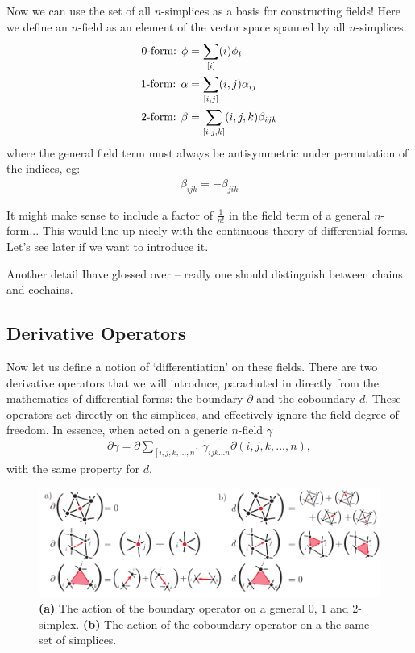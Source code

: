 \documentclass[11pt, oneside]{article} %
\numberwithin{equation}{section}
\begin{document}
Now we can use the set of all $n$-simplices as a basis for constructing fields! Here we define an $n$-field as an element of the vector space spanned by all $n$-simplices:
\begin{align}
    \textup{0-form: } \phi &= \sum_{[i]} (i) \phi_{i}  \\ 
    \textup{1-form: } \alpha &= \sum_{[i,j]} (i,j) \alpha_{ij} \\ 
    \textup{2-form: } \beta &= \sum_{[i,j,k]}(i,j,k) \beta_{ijk} 
\end{align}
where the general field term must always be antisymmetric under permutation of the indices, eg:
\begin{align}
    \beta_{ijk} = - \beta_{jik}
\end{align}

\begin{shaded}
    It might make sense to include a factor of $\frac 1{n!}$ in the field term of a general $n$-form... This would line up nicely with the continuous theory of differential forms. Let's see later if we want to introduce it.
\end{shaded}

\begin{incorrect}
    Another detail Ihave glossed over -- really one should distinguish between chains and cochains. 
\end{incorrect}

\subsection{Derivative Operators}

Now let us define a notion of `differentiation' on these fields. There are two derivative operators that we will introduce, parachuted in directly from the mathematics of differential forms: the boundary $\partial$ and the coboundary $d$. These operators act directly on the simplices, and effectively ignore the field degree of freedom. In essence, when acted on a generic $n$-field $\gamma$
\begin{align}
    \partial \gamma = \partial \sum_{[i,j,k,...,n]} \gamma_{ijk...n} \partial (i,j,k,...,n),
\end{align}
with the same property for $d$.

\begin{figure}
    \centering
    \includegraphics[width=\linewidth]{figs/boundaries.pdf}
    \caption{
    \textbf{(a)} The action of the boundary operator on a general 0, 1 and 2-simplex.
    \textbf{(b)} The action of the coboundary operator on a the same set of simplices.
    }
    \label{fig:boundaries}
\end{figure}
\end{document}
